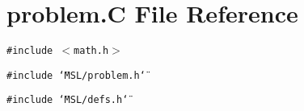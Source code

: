 \section{problem.C File Reference}
\label{problem_8C}
{\tt \#include $<$math.h$>$}\par
{\tt \#include \char`\"{}MSL/problem.h\char`\"{}}\par
{\tt \#include \char`\"{}MSL/defs.h\char`\"{}}\par
